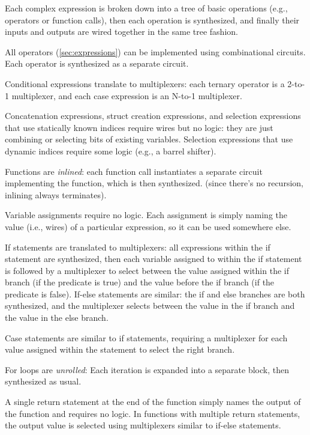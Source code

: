 \begin{compactitem}
\item Each complex expression is broken down into a tree of basic operations (e.g., operators or function calls), then each operation is synthesized,
  and finally their inputs and outputs are wired together in the same tree fashion.
\item All operators (\autoref{sec:expressions}) can be implemented using combinational circuits.
  Each operator is synthesized as a separate circuit.
\item Conditional expressions translate to multiplexers: each ternary operator is a 2-to-1 multiplexer, and each case expression is an N-to-1 multiplexer.
\item Concatenation expressions, struct creation expressions, and selection expressions that use statically known indices require wires but no logic:
  they are just combining or selecting bits of existing variables.
  Selection expressions that use dynamic indices require some logic (e.g., a barrel shifter).
\item Functions are \emph{inlined}: each function call instantiates a separate circuit implementing the function, which is then synthesized.
  (since there's no recursion, inlining always terminates).
\item Variable assignments require no logic. Each assignment is simply naming the value (i.e., wires) of a particular expression,
  so it can be used somewhere else.
\item If statements are translated to multiplexers: all expressions within the if statement are synthesized,
  then each variable assigned to within the if statement is followed by a multiplexer
  to select between the value assigned within the if branch (if the predicate is true)
  and the value before the if branch (if the predicate is false).
  If-else statements are similar: the if and else branches are both synthesized,
  and the multiplexer selects between the value in the if branch and the value in the else branch.
\item Case statements are similar to if statements, requiring a multiplexer for each value assigned
  within the statement to select the right branch.
\item For loops are \emph{unrolled}: Each iteration is expanded into a separate block, then synthesized as usual.
\item A single return statement at the end of the function simply names the output of the function and requires no logic.
  In functions with multiple return statements, the output value is selected using multiplexers similar to if-else statements.
\end{compactitem}



